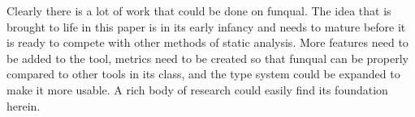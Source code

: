 Clearly there is a lot of work that could be done on funqual.  The idea that is brought to life in this paper is in its early infancy and needs to mature before it is ready to compete with other methods of static analysis.  More features need to be added to the tool, metrics need to be created so that funqual can be properly compared to other tools in its class, and the type system could be expanded to make it more usable.  A rich body of research could easily find its foundation herein.  


